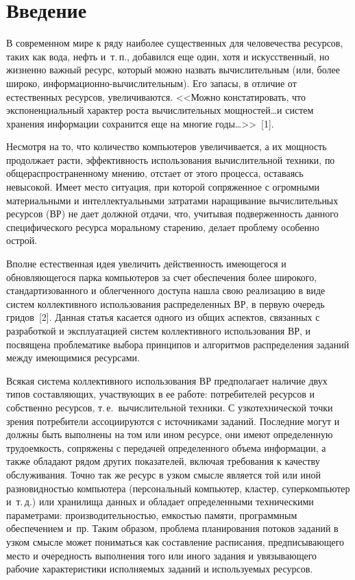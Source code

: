       \begin{multicols}{2}

      \label{st\stat}

\section{Введение}
  В современном мире к ряду наиболее существенных для человечества ресурсов, таких как 
вода, нефть и~т.\,п., добавился еще один, хотя и искусственный, но жизненно важный 
ресурс, который можно назвать вычислительным (или, более широко, ин\-фор\-ма\-ци\-он\-но-вы\-чис\-ли\-тель\-ным). 
Его запасы, в отличие от естественных ресурсов, увеличиваются. 
<<Можно констатировать, что экспоненциальный характер роста вычислительных 
мощностей\ldots и систем хранения информации сохранится еще на многие годы\ldots>>~[1].
  
Несмотря на то, что количество компьютеров увеличивается, а их мощность продолжает рас\-ти, 
эффективность использования вычислительной техники, по общераспространенному 
мнению, отстает от этого процесса, оставаясь невысокой. Имеет место ситуация, при которой 
сопряженное с огромными материальными и интеллектуальными затратами наращивание 
вычислительных ресурсов (ВР) не дает должной отдачи, что, учитывая 
подверженность данного специфического ресурса моральному старению, делает проблему 
особенно острой.
  
  Вполне естественная идея увеличить действенность имеющегося и обновляющегося парка 
компьютеров за счет обеспечения более широкого, стандартизованного и облегченного 
доступа нашла свою реализацию в виде систем коллективного использования 
распределенных ВР, в первую очередь гридов~[2]. Данная статья касается одного из общих 
аспектов, связанных с разработкой и эксплуатацией систем коллективного использования 
ВР, и посвящена проблематике выбора принципов и алгоритмов распределения заданий 
между имеющимися ресурсами.
  
  Всякая система коллективного использования ВР предполагает наличие двух типов 
со\-став\-ля\-ющих, участвующих в ее работе: потребителей ресурсов и собственно ресурсов, т.\,е.\ 
вычислительной техники. С узкотехнической точки зрения потребители ассоциируются 
с источниками заданий. Последние могут и должны быть выполнены на том или ином ресурсе, 
они имеют определенную трудоемкость, сопряжены с передачей определенного объема 
информации, а также обладают рядом других показателей, включая требования к качеству 
обслуживания. Точно так же ресурс в узком смысле является той или иной разновидностью 
компьютера (персональный компьютер, кластер, суперкомпьютер и~т.\,д.) или хранилища 
данных и обладает определенными техническими па\-ра\-мет\-ра\-ми: производительностью, 
емкостью памяти, программным обеспечением и~пр. Таким образом, проблема 
планирования потоков заданий в узком смысле может пониматься как составление 
расписания, предписывающего место и очередность выполнения того или иного задания и 
увязывающего рабочие характеристики исполняемых заданий и используемых ресурсов.
  

\end{multicols}
